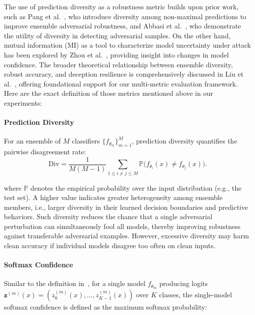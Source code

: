 The use of prediction diversity as a robustness metric builds upon prior work, such as Pang et al.~\cite{pang2019improving}, who introduce diversity among non-maximal predictions to improve ensemble adversarial robustness, and Abbasi et al.~\cite{abbasi2020toward}, who demonstrate the utility of diversity in detecting adversarial samples. On the other hand, mutual information (MI) as a tool to characterize model uncertainty under attack has been explored by Zhou et al.~\cite{zhou2022improving}, providing insight into changes in model confidence. The broader theoretical relationship between ensemble diversity, robust accuracy, and deception resilience is comprehensively discussed in Liu et al.~\cite{liu2019deep}, offering foundational support for our multi-metric evaluation framework. Here are the exact definition of those metrics mentioned above in our experiments:


\paragraph{Prediction Diversity}
For an ensemble of $M$ classifiers $\{f_{\theta_m}\}_{m=1}^M$, prediction diversity quantifies the pairwise disagreement rate:
\begin{equation}
\text{Div} = \frac{1}{M(M-1)} \sum_{1 \leq i \neq j \leq M} 
\mathbb{P}\big( f_{\theta_i}(x) \neq f_{\theta_j}(x) \big).
\end{equation}

where $\mathbb{P}$ denotes the empirical probability over the input distribution (e.g., the test set).
A higher value indicates greater heterogeneity among ensemble members, 
i.e., larger diversity in their learned decision boundaries and predictive behaviors. 
Such diversity reduces the chance that a single adversarial perturbation can simultaneously fool all models, 
thereby improving robustness against transferable adversarial examples.
However, excessive diversity may harm clean accuracy if individual models disagree too often on clean inputs.

\paragraph{Softmax Confidence}
Similar to the definition in~\cite{guo2017calibration}, 
for a single model $f_{\theta_m}$ producing logits 
$\mathbf{z}^{(m)}(x) = (z^{(m)}_0(x), \ldots, z^{(m)}_{K-1}(x))$ 
over $K$ classes, the single-model softmax confidence is defined as the maximum softmax probability:

